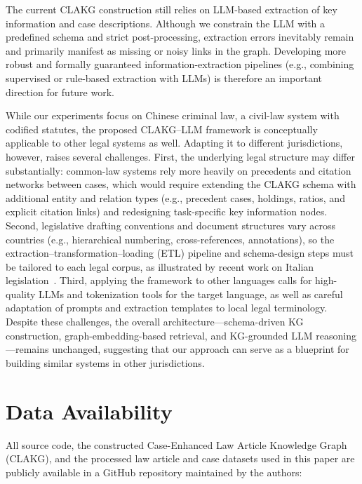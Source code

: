 \documentclass[review,times,nonatbib]{elsarticle} %
\renewcommand{\textcolor}[2]{#2}
\begin{document}
\textcolor{blue}{The current CLAKG construction still relies on LLM-based extraction of key information and case descriptions. Although we constrain the LLM with a predefined schema and strict post-processing, extraction errors inevitably remain and primarily manifest as missing or noisy links in the graph. Developing more robust and formally guaranteed information-extraction pipelines (e.g., combining supervised or rule-based extraction with LLMs) is therefore an important direction for future work. }

\textcolor{blue}{While our experiments focus on Chinese criminal law, a civil-law system with codified statutes, the proposed CLAKG--LLM framework is conceptually applicable to other legal systems as well. Adapting it to different jurisdictions, however, raises several challenges. First, the underlying legal structure may differ substantially: common-law systems rely more heavily on precedents and citation networks between cases, which would require extending the CLAKG schema with additional entity and relation types (e.g., precedent cases, holdings, ratios, and explicit citation links) and redesigning task-specific key information nodes. Second, legislative drafting conventions and document structures vary across countries (e.g., hierarchical numbering, cross-references, annotations), so the extraction--transformation--loading (ETL) pipeline and schema-design steps must be tailored to each legal corpus, as illustrated by recent work on Italian legislation~\cite{sovrano2020legal,colombo2025llm}. Third, applying the framework to other languages calls for high-quality LLMs and tokenization tools for the target language, as well as careful adaptation of prompts and extraction templates to local legal terminology. Despite these challenges, the overall architecture---schema-driven KG construction, graph-embedding-based retrieval, and KG-grounded LLM reasoning---remains unchanged, suggesting that our approach can serve as a blueprint for building similar systems in other jurisdictions.}






\section*{\textcolor{blue}{Data Availability}}

\textcolor{blue}{All source code, the constructed Case-Enhanced Law Article Knowledge Graph (CLAKG), and the processed law article and case datasets used in this paper are publicly available in a GitHub repository maintained by the authors:}
\end{document}
